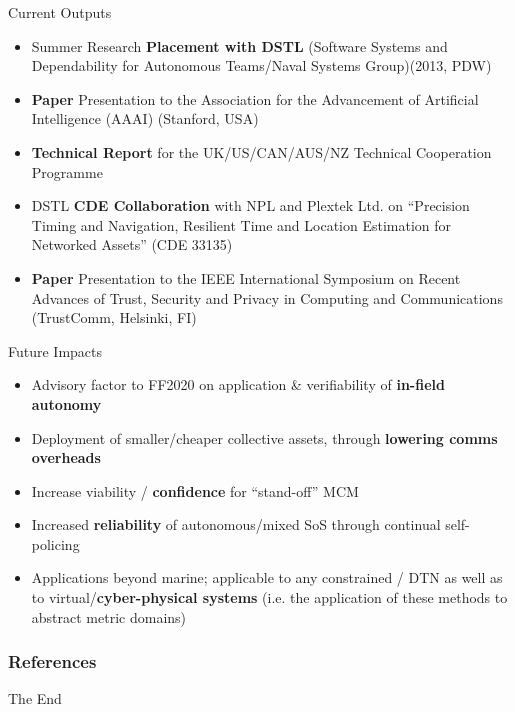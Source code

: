 \documentclass{beamer}
\begin{document}
\begin{frame}{Current Outputs}
	\begin{itemize}
		\item Summer Research \textbf{Placement with DSTL} (Software Systems and Dependability for Autonomous Teams/Naval Systems Group)(2013, PDW)
		\item \textbf{Paper} Presentation to the Association for the Advancement of Artificial Intelligence (AAAI) (Stanford, USA) \cite{Bolster2014}
		\item \textbf{Technical Report} for the UK/US/CAN/AUS/NZ Technical Cooperation Programme \cite{Bolster2014a}
		\item DSTL \textbf{CDE Collaboration} with NPL and Plextek Ltd. on ``Precision Timing and Navigation, Resilient Time and Location Estimation for Networked Assets'' (CDE 33135)
		\item \textbf{Paper} Presentation to the IEEE International Symposium on Recent Advances of Trust, Security and Privacy in Computing and Communications (TrustComm, Helsinki, FI) \cite{Bolster2015}
	\end{itemize}
\end{frame}

\begin{frame}{Future Impacts}
	\begin{itemize}
		\item Advisory factor to FF2020 on application \& verifiability of \textbf{in-field autonomy}
		\item Deployment of smaller/cheaper collective assets, through \textbf{lowering comms overheads}
		\item Increase viability / \textbf{confidence} for ``stand-off'' MCM
		\item Increased \textbf{reliability} of autonomous/mixed SoS through continual self-policing
		\item Applications beyond marine; applicable to any constrained / DTN as well as to virtual/\textbf{cyber-physical systems} (i.e. the application of these methods to abstract metric domains)
	\end{itemize}
	
\end{frame}

%
\begin{frame}[t,allowframebreaks]
  \frametitle{References}
  \printbibliography[title=References]%
\end{frame}

\begin{frame}
  \centerline{The End}
\end{frame}
\end{document}

